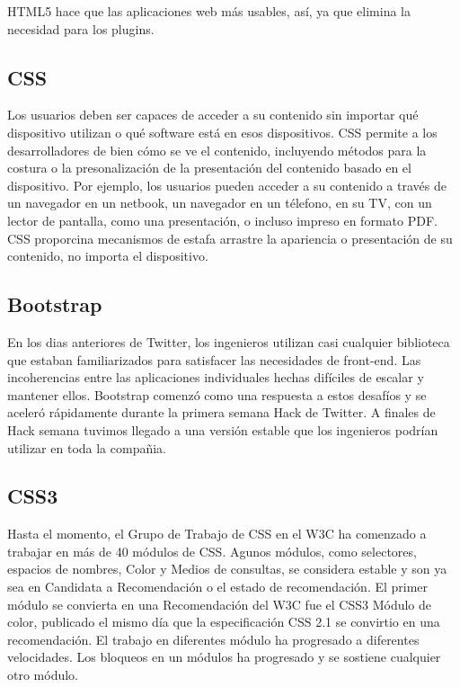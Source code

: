 HTML5 hace que las aplicaciones web m\'{a}s usables, as\'{i}, ya que elimina la
necesidad para los plugins. \cite{wang2013definitive}


\subsection{CSS}

Los usuarios deben ser capaces de acceder a su contenido sin importar qu\'{e} 
dispositivo utilizan o qu\'{e} software est\'{a} en esos dispositivos. CSS 
permite a los desarrolladores de bien c\'{o}mo se ve el contenido, incluyendo 
m\'{e}todos para la costura o la presonalizaci\'{o}n de la presentaci\'{o}n del
contenido basado en el dispositivo. Por ejemplo, los usuarios pueden acceder a su
contenido a trav\'{e}s de un navegador en un netbook, un navegador en un t\'{e}lefono,
en su TV, con un lector de pantalla, como una presentaci\'{o}n, o incluso impreso
en formato PDF. CSS proporcina mecanismos de estafa arrastre la apariencia o 
presentaci\'{o}n de su contenido, no importa el dispositivo.\cite{weyl2012s}

\subsection{Bootstrap}

En los dias anteriores de Twitter, los ingenieros utilizan casi cualquier 
biblioteca que estaban familiarizados para satisfacer las necesidades de 
front-end. Las incoherencias entre las aplicaciones individuales hechas dif\'{i}ciles
de escalar y mantener ellos. Bootstrap comenz\'{o} como una respuesta a estos 
desaf\'{i}os y se aceler\'{o} r\'{a}pidamente durante la primera semana Hack de
Twitter. A finales de Hack semana tuvimos llegado a una versi\'{o}n estable que
los ingenieros podr\'{i}an utilizar en toda la compa\~{n}ia.\cite{spurlock2013bootstrap}

\subsection{CSS3}

Hasta el momento, el Grupo de Trabajo de CSS en el W3C ha comenzado a trabajar 
en m\'{a}s de 40 m\'{o}dulos de CSS. Agunos m\'{o}dulos, como selectores, 
espacios de nombres, Color y Medios de consultas, se considera estable y son ya
sea en Candidata a Recomendaci\'{o}n o el estado de recomendaci\'{o}n. El primer
m\'{o}dulo se convierta en una Recomendaci\'{o}n del W3C fue el CSS3 M\'{o}dulo
de color, publicado el mismo d\'{i}a que la especificaci\'{o}n CSS 2.1 se convirtio
en una recomendaci\'{o}n. El trabajo en diferentes m\'{o}dulo ha progresado a 
diferentes velocidades. Los bloqueos en un m\'{o}dulos ha progresado y se sostiene
cualquier otro m\'{o}dulo.\cite{spurlock2013bootstrap}

